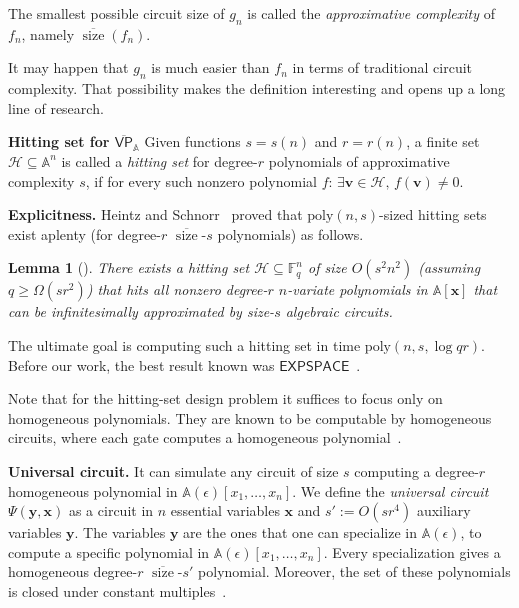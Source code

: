 \documentclass[11pt]{article}
\numberwithin{equation}{section}
\newtheorem{lemma}[theorem]{Lemma}
\theoremstyle{definition}
\theoremstyle{plain}
\newcommand{\cclass}[1]{\textsf{#1}}
\newcommand{\F}{\mathbb{F}}
\newcommand{\calH}{\mathcal{H}}
\newcommand{\aff}{\mathbb{A}}
\DeclareMathOperator{\sz}{\mathrm{size}}
\newcommand{\ol}[1]{\overline{#1}}
\newcommand{\EXPSPACE}{\cclass{EXPSPACE}\xspace} %
\newcommand{\VP}{\cclass{VP}\xspace}  %
\newcommand{\VPbar}{\overline{\VP}\xspace}  %
\begin{document}
The smallest possible circuit size of $g_n$ is called the \emph{approximative complexity} of $f_n$, namely $\ol{\sz}(f_n)$. 

It may happen that $g_n$ is much easier than $f_n$ in terms of traditional circuit complexity. That possibility makes the definition interesting and opens up a long line of research. 

\smallskip\noindent
%
\textbf{Hitting set for $\VPbar_\aff$}       %
Given functions $s=s(n)$ and $r=r(n)$, a finite
%
set %
$\calH\subseteq \aff^n$ is called a \emph{hitting set} for degree-$r$ polynomials of approximative complexity $s$, if for every such nonzero polynomial $f$: $\exists \mathbf v\in\calH, \, f(\mathbf v)\ne0$.

\smallskip\noindent
\textbf{Explicitness.} Heintz and Schnorr~\cite{heintz1980testing} proved that 
%
$\mathrm{poly}(n,s)$-sized %
hitting sets exist aplenty (for degree-$r$ $\ol{\sz}$-$s$ %
polynomials) as follows. %

%
\begin{lemma}[{\cite[Theorem~4.4]{heintz1980testing}}]\label{lem-hs80}
 There exists a 
 hitting set %
 $\mathcal{H}\subseteq \F_q^n $ of size $O(s^2n^2)$ (assuming $q\geq\Omega(sr^2)$) that hits all nonzero degree-$r$ $n$-variate polynomials in $\aff[\mathbf x]$ that can be infinitesimally approximated by size-$s$ algebraic circuits. 
\end{lemma}

The ultimate goal is computing such a hitting set in 
%
time $\mathrm{poly}(n,s,\log qr)$. %
Before our work, the best result known was
%
$\EXPSPACE$~\cite{mul12, mulmuley2017geometric}.

Note that for the hitting-set design problem it suffices to focus only on homogeneous polynomials. They are known to be computable by homogeneous circuits, where each gate computes a homogeneous polynomial~\cite{shpilka2010arithmetic}.

\smallskip\noindent
\textbf{Universal circuit.}
It can simulate any circuit of size $s$ computing a degree-$r$ homogeneous polynomial in $\aff(\epsilon)[x_1,\ldots,x_n]$. We define the \emph{universal circuit} $\Psi(\mathbf{y},\mathbf{x})$ as a circuit in $n$ essential variables $\mathbf{x}$ and $s':=O(sr^4)$ auxiliary variables $\mathbf y$. The variables $\mathbf y$ are the ones that one can specialize in $\aff(\epsilon)$, to compute a specific polynomial in $\aff(\epsilon)[x_1,\ldots,x_n]$. Every specialization gives a homogeneous degree-$r$ $\ol{\sz}$-$s'$ polynomial. Moreover, the set of these polynomials is closed under constant multiples~\cite[Theorem~2.2]{forbes2017pspace}.
\end{document}
